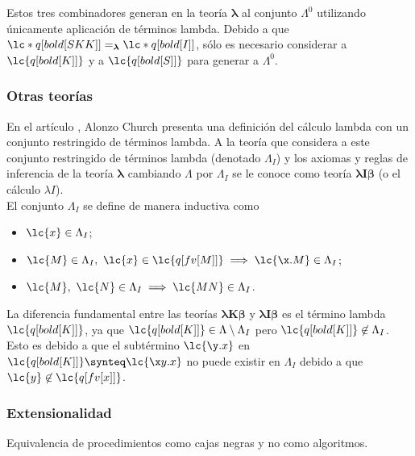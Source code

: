 Estos tres combinadores generan en la teoría \(\boldsymbol{\lambda}\) al
conjunto \(\Lambda^{0}\) utilizando únicamente aplicación de términos lambda.
Debido a que \(\lc*{q[bold[S K K]]}=_{\boldsymbol{\lambda}} \lc*{q[bold[I]]}\),
sólo es necesario considerar a \(\lc{q[bold[K]]}\) y a \(\lc{q[bold[S]]}\) para
generar a \(\Lambda^{0}\). \\

\subsubsection{Otras teorías}

En el artículo \cite{Church:LambdaConversion}, Alonzo Church presenta una
definición del cálculo lambda con un conjunto restringido de términos lambda. A
la teoría que considera a este conjunto restringido de términos lambda (denotado
\(\Lambda_{I}\)) y los axiomas  y reglas de inferencia de la teoría
\(\boldsymbol{\lambda}\) cambiando \(\Lambda\) por \(\Lambda_{I}\) se le conoce
como teoría \(\boldsymbol{\lambda I \beta}\) (o el cálculo \(\lambda I\)). \\

El conjunto \(\Lambda_{I}\) se define de manera inductiva como
\begin{itemize}
\item \(\lc{x} \in \Lambda_{I}\);
\item \(\lc{M}\in \Lambda_{I},\ \lc{x} \in \lc{q[fv[M]]} \implies \lc{\x.M} \in
  \Lambda_{I}\);
\item \(\lc{M},\ \lc{N} \in \Lambda_{I} \implies \lc{M N} \in \Lambda_{I}\).
\end{itemize}

La diferencia fundamental entre las teorías \(\boldsymbol{\lambda K \beta}\) y
\(\boldsymbol{\lambda I \beta}\) es el término lambda \(\lc{q[bold[K]]}\), ya que
\(\lc{q[bold[K]]} \in \Lambda \setminus \Lambda_{I}\) pero \(\lc{q[bold[K]]}
\not\in \Lambda_{I}\). Esto es debido a que el subtérmino \(\lc{\y.x}\) en
\(\lc{q[bold[K]]}\synteq \lc{\x y.x}\) no puede existir en \(\Lambda_{I}\)
debido a que \(\lc{y} \not\in \lc{q[fv[x]]}\). \\




\subsubsection{Extensionalidad}

Equivalencia de procedimientos como cajas negras y no como algoritmos.


